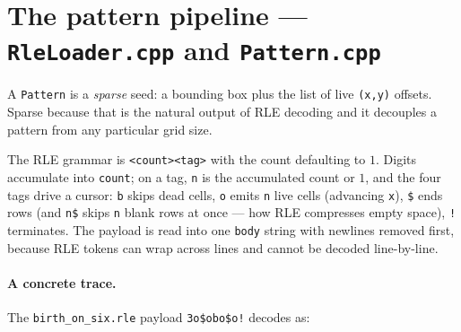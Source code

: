 \documentclass[
	english,
	letterpaper, oneside
]{article}
\begin{document}
\section{The pattern pipeline --- \texttt{RleLoader.cpp} and \texttt{Pattern.cpp}}
\label{sec:patterns}

A \texttt{Pattern} is a \emph{sparse} seed: a bounding box plus the list of live
\texttt{(x,y)} offsets. Sparse because that is the natural output of RLE decoding
and it decouples a pattern from any particular grid size.


The RLE grammar is \texttt{<count><tag>} with the count defaulting to $1$. Digits
accumulate into \texttt{count}; on a tag, \texttt{n} is the accumulated count or
$1$, and the four tags drive a cursor: \texttt{b} skips dead cells, \texttt{o}
emits \texttt{n} live cells (advancing \texttt{x}), \texttt{\$} ends rows (and
\texttt{n\$} skips \texttt{n} blank rows at once --- how RLE compresses empty
space), \texttt{!} terminates. The payload is read into one \texttt{body} string
with newlines removed first, because RLE tokens can wrap across lines and cannot
be decoded line-by-line.

\paragraph{A concrete trace.} The \texttt{birth\_on\_six.rle} payload
\texttt{3o\$obo\$o!} decodes as:
\end{document}
